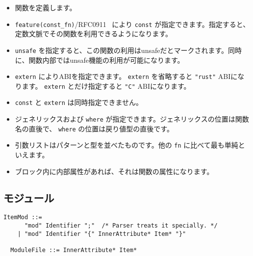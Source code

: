 \documentclass[dvipdfmx,uplatex,papersize,a4paper,10pt]{jsbook}
\theoremstyle{definition}
\begin{document}
\begin{itemize}
  \item 関数を定義します。
  \item \verb|feature(const_fn)|/RFC0911~\cite{RustRFC0911} により \verb|const| が指定できます。指定すると、定数文脈でその関数を利用できるようになります。
  \item \verb|unsafe| を指定すると、この関数の利用はunsafeだとマークされます。同時に、関数内部ではunsafe機能の利用が可能になります。
  \item \verb|extern| によりABIを指定できます。 \verb|extern| を省略すると \verb|"rust"| ABIになります。 \verb|extern| とだけ指定すると \verb|"C"| ABIになります。
  \item \verb|const| と \verb|extern| は同時指定できません。
  \item ジェネリックスおよび \verb|where| が指定できます。ジェネリックスの位置は関数名の直後で、 \verb|where| の位置は戻り値型の直後です。
  \item 引数リストはパターンと型を並べたものです。他の \verb|fn| に比べて最も単純といえます。
  \item ブロック内に内部属性があれば、それは関数の属性になります。
\end{itemize}

\subsection{モジュール}

\begin{lstlisting}[language=BNFLike, gobble=2]
  ItemMod ::=
      "mod" Identifier ";"  /* Parser treats it specially. */
    | "mod" Identifier "{" InnerAttribute* Item* "}"

  ModuleFile ::= InnerAttribute* Item*
\end{lstlisting}
\end{document}
